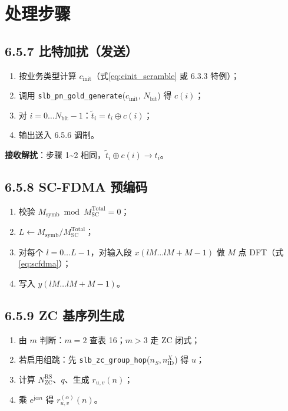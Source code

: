 \documentclass[11pt,a4paper]{ctexart}
\begin{document}
\section{处理步骤}

\subsection{6.5.7 比特加扰（发送）}

\begin{enumerate}
  \item 按业务类型计算 $c_{\mathrm{init}}$（式\eqref{eq:cinit_scramble} 或 6.3.3 特例）；
  \item 调用 \texttt{slb\_pn\_gold\_generate}($c_{\mathrm{init}}$, $N_{\mathrm{bit}}$) 得 $c(i)$；
  \item 对 $i=0\ldots N_{\mathrm{bit}}-1$：$\tilde{t}_i = t_i \oplus c(i)$；
  \item 输出送入 6.5.6 调制。
\end{enumerate}

\textbf{接收解扰}：步骤 1\textasciitilde 2 相同，$\tilde{t}_i \oplus c(i) \rightarrow t_i$。

\subsection{6.5.8 SC-FDMA 预编码}

\begin{enumerate}
  \item 校验 $M_{\mathrm{symb}} \bmod M_{\mathrm{SC}}^{\mathrm{Total}} = 0$；
  \item $L \leftarrow M_{\mathrm{symb}}/M_{\mathrm{SC}}^{\mathrm{Total}}$；
  \item 对每个 $l=0\ldots L-1$，对输入段 $x(lM\ldots lM+M-1)$ 做 $M$ 点 DFT（式\eqref{eq:scfdma}）；
  \item 写入 $y(lM\ldots lM+M-1)$。
\end{enumerate}

\subsection{6.5.9 ZC 基序列生成}

\begin{enumerate}
  \item 由 $m$ 判断：$m=2$ 查表 16；$m>3$ 走 ZC 闭式；
  \item 若启用组跳：先 \texttt{slb\_zc\_group\_hop}($n_S,n_{\mathrm{ID}}^{X}$) 得 $u$；
  \item 计算 $N_{\mathrm{ZC}}^{\mathrm{RS}}$、$q$、生成 $r_{u,v}(n)$；
  \item 乘 $e^{\mathrm{j}\alpha n}$ 得 $r_{u,v}^{(\alpha)}(n)$。
\end{enumerate}
\end{document}
